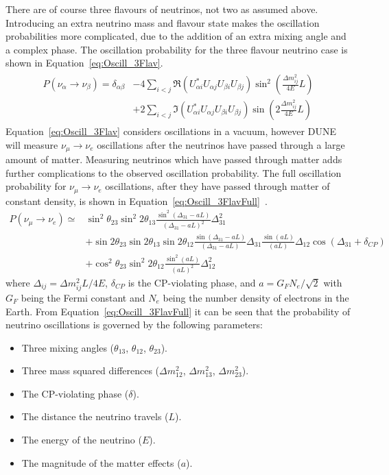 There are of course three flavours of neutrinos, not two as assumed above. Introducing an extra neutrino mass and flavour state makes the oscillation probabilities more complicated, due to the addition of an extra mixing angle and a complex phase. The oscillation probability for the three flavour neutrino case is shown in Equation~\ref{eq:Oscill_3Flav}.
\begin{align}
  \begin{split}
    \label{eq:Oscill_3Flav}
    P(\nu_{\alpha}\rightarrow\nu_{\beta}) = \delta_{\alpha\beta}
    & - 4 \sum_{i<j}\Re(U^{\ast}_{\alpha i}U_{\alpha j}U_{\beta i}U_{\beta j}) \sin^2\left(\frac{\Delta m^{2}_{ij}}{4E}L\right) \\
    & + 2 \sum_{i<j}\Im(U^{\ast}_{\alpha i}U_{\alpha j}U_{\beta i}U_{\beta j}) \sin\left(2\frac{\Delta m^{2}_{ij}}{4E}L\right)
  \end{split}
\end{align}
Equation~\ref{eq:Oscill_3Flav} considers oscillations in a vacuum, however DUNE will measure $\nu_{\mu}\rightarrow\nu_{e}$ oscillations after the neutrinos have passed through a large amount of matter. Measuring neutrinos which have passed through matter adds further complications to the observed oscillation probability. The full oscillation probability for $\nu_{\mu}\rightarrow\nu_{e}$ oscillations, after they have passed through matter of constant density, is shown in Equation~\ref{eq:Oscill_3FlavFull}~\citep{Nunokawa:2007qh}.
\begin{align}
  P(\nu_{\mu}\rightarrow\nu_{e}) \simeq
  & \sin^{2}\theta_{23} \sin^{2}2\theta_{13} \frac{\sin^{2}(\Delta_{31}-aL)}{(\Delta_{31}-aL)^2}\Delta^{2}_{31} \label{eq:Oscill_3FlavFull} \\
  &+ \sin2\theta_{23} \sin2\theta_{13} \sin2\theta_{12} \frac{\sin(\Delta_{31}-aL)}{(\Delta_{31}-aL)}\Delta_{31} \frac{\sin(aL)}{(aL)} \Delta_{12} \cos(\Delta_{31}+\delta_{CP}) \nonumber \\
  &+ \cos^{2}\theta_{23} \sin^{2}2\theta_{12} \frac{\sin^{2}(aL)}{(aL)^2}\Delta^{2}_{12} \nonumber
\end{align}
where $\Delta_{ij} = \Delta m^{2}_{ij}L/4E$, $\delta_{CP}$ is the CP-violating phase, and $a = G_{F}N_{e}/\sqrt{2}$ with $G_{F}$ being the Fermi constant and $N_{e}$ being the number density of electrons in the Earth. From Equation~\ref{eq:Oscill_3FlavFull} it can be seen that the probability of neutrino oscillations is governed by the following parameters:
\begin{itemize}
 \item Three mixing angles ($\theta_{13}$, $\theta_{12}$, $\theta_{23}$).
 \item Three mass squared differences ($\Delta m^{2}_{12}$, $\Delta m^{2}_{13}$, $\Delta m^{2}_{23}$).
 \item The CP-violating phase ($\delta$).
 \item The distance the neutrino travels ($L$).
 \item The energy of the neutrino ($E$).
 \item The magnitude of the matter effects ($a$).
\end{itemize}
